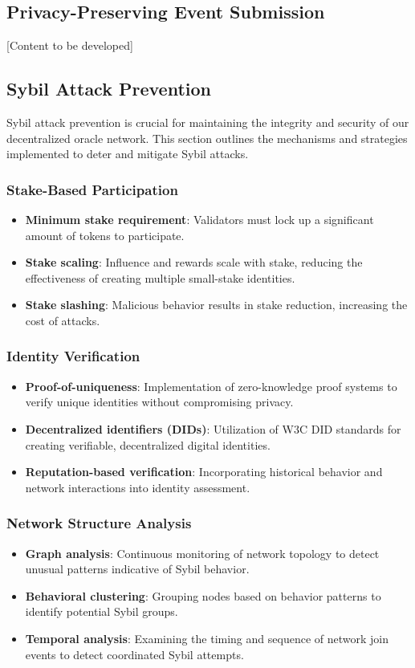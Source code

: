 \documentclass[12pt,a4paper]{article}
\begin{document}
	
	\subsection{Privacy-Preserving Event Submission}
	[Content to be developed]

	\subsection{Sybil Attack Prevention}
	Sybil attack prevention is crucial for maintaining the integrity and security of our decentralized oracle network. This section outlines the mechanisms and strategies implemented to deter and mitigate Sybil attacks.
	
	\subsubsection{Stake-Based Participation}
	\begin{itemize}
		\item \textbf{Minimum stake requirement}: Validators must lock up a significant amount of tokens to participate.
		\item \textbf{Stake scaling}: Influence and rewards scale with stake, reducing the effectiveness of creating multiple small-stake identities.
		\item \textbf{Stake slashing}: Malicious behavior results in stake reduction, increasing the cost of attacks.
	\end{itemize}
	
	\subsubsection{Identity Verification}
	\begin{itemize}
		\item \textbf{Proof-of-uniqueness}: Implementation of zero-knowledge proof systems to verify unique identities without compromising privacy.
		\item \textbf{Decentralized identifiers (DIDs)}: Utilization of W3C DID standards for creating verifiable, decentralized digital identities.
		\item \textbf{Reputation-based verification}: Incorporating historical behavior and network interactions into identity assessment.
	\end{itemize}
	
	\subsubsection{Network Structure Analysis}
	\begin{itemize}
		\item \textbf{Graph analysis}: Continuous monitoring of network topology to detect unusual patterns indicative of Sybil behavior.
		\item \textbf{Behavioral clustering}: Grouping nodes based on behavior patterns to identify potential Sybil groups.
		\item \textbf{Temporal analysis}: Examining the timing and sequence of network join events to detect coordinated Sybil attempts.
	\end{itemize}
	
\end{document}

